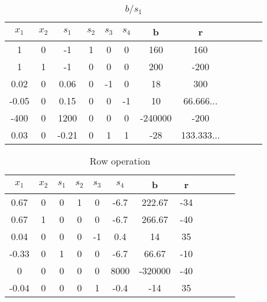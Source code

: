 \documentclass{article}
\begin{document}
  \begin{table}[H]
  \centering
  \caption{$b/s_1$}
  \begin{tabular}{|c|c|c|c|c|c|c|c|c|c|c|c|}
  \hline
  $x_1$ & $x_2$ & $s_1$  & $s_2$ & $s_3$ & $s_4$ & b & r  \\ \hline
  1     & 0      & -1       & 1       & 0    & 0    & 160       & 160\\ \hline
  1     & 1      & -1       & 0       & 0    & 0    & 200       & -200\\ \hline
  0.02  & 0      & 0.06     & 0       & -1   & 0    & 18        & 300\\ \hline
  -0.05 & 0      & 0.15     & 0       & 0    & -1   & 10        & \cellcolor{yellow}66.666...\\ \hline
  -400  & 0      & 1200     & 0       & 0    & 0    & -240000   & -200\\ \hline
  0.03  & 0      & \cellcolor{green}-0.21    & 0       & 1    & 1   & -28       & 133.333...   \\ \hline
  \end{tabular}
  \end{table}

  \begin{table}[H]
  \centering
  \caption{Row operation}
  \begin{tabular}{|c|c|c|c|c|c|c|c|c|c|c|c|}
  \hline
  $x_1$ & $x_2$ & $s_1$  & $s_2$ & $s_3$ & $s_4$ & b & r  \\ \hline
  0.67     & 0      & 0       & 1       & 0    & -6.7    & 222.67  & -34\\ \hline
  0.67     & 1      & 0       & 0       & 0    & -6.7    & 266.67  & -40\\ \hline
  0.04     & 0      & 0       & 0       & -1   & 0.4     & 14      & \cellcolor{yellow}35\\ \hline
  -0.33    & 0      & 1       & 0       & 0    & -6.7    & 66.67   & -10\\ \hline
  0        & 0      & 0       & 0       & 0    & 8000    & -320000 & -40\\ \hline
  -0.04    & 0      & 0       & 0       & 1    & \cellcolor{green}-0.4    & -14     & 35\\ \hline
  \end{tabular}
  \end{table}
\end{document}
